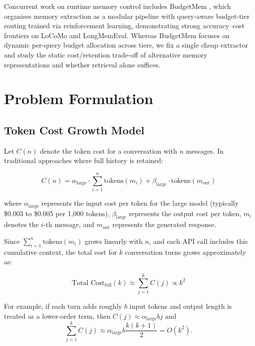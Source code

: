 \documentclass[conference]{IEEEtran}
\begin{document}
Concurrent work on runtime memory control includes BudgetMem \cite{zhang2026budgetmem}, which organises memory extraction as a modular pipeline with query-aware budget-tier routing trained via reinforcement learning, demonstrating strong accuracy--cost frontiers on LoCoMo and LongMemEval. Whereas BudgetMem focuses on dynamic per-query budget allocation across tiers, we fix a single cheap extractor and study the static cost/retention trade-off of alternative memory representations and whether retrieval alone suffices.

\section{Problem Formulation}
\label{sec:problem}

\subsection{Token Cost Growth Model}

Let $C(n)$ denote the token cost for a conversation with $n$ messages. In traditional approaches where full history is retained:

\begin{equation}
C(n) = \alpha_{\text{large}} \cdot \sum_{i=1}^{n} \text{tokens}(m_i) + \beta_{\text{large}} \cdot \text{tokens}(m_{\text{out}})
\end{equation}

where $\alpha_{\text{large}}$ represents the input cost per token for the large model (typically \$0.003 to \$0.005 per 1,000 tokens), $\beta_{\text{large}}$ represents the output cost per token, $m_i$ denotes the $i$-th message, and $m_{\text{out}}$ represents the generated response.

Since $\sum_{i=1}^{n} \text{tokens}(m_i)$ grows linearly with $n$, and each API call includes this cumulative context, the total cost for $k$ conversation turns grows approximately as:

\begin{equation}
\text{Total Cost}_{\text{full}}(k) \approx \sum_{j=1}^{k} C(j) \propto k^2
\end{equation}

For example, if each turn adds roughly $b$ input tokens and output length is treated as a lower-order term, then $C(j) \approx \alpha_{\text{large}} b j$ and
\begin{equation}
\sum_{j=1}^{k} C(j) \approx \alpha_{\text{large}} b \frac{k(k+1)}{2} = O(k^2).
\end{equation}
\end{document}
